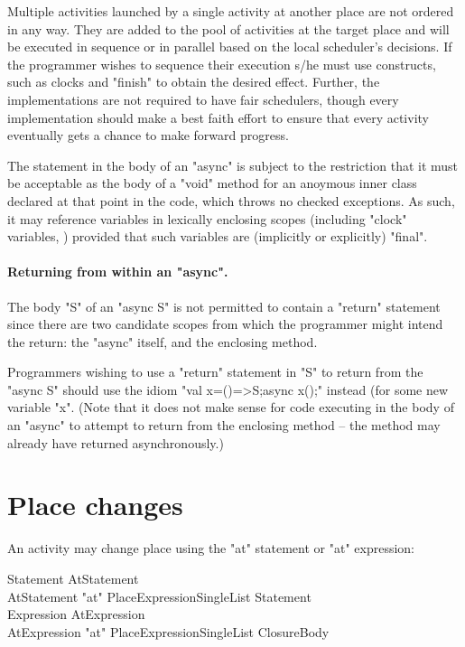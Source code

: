 Multiple activities launched by a single activity at another place are
not ordered in any way. They are added to the pool of activities at
the target place and will be executed in sequence or in parallel based
on the local scheduler's decisions. If the programmer wishes to
sequence their execution s/he must use \Xten{} constructs, such as
clocks and \xcd"finish" to obtain the desired effect.  Further, the
\Xten{} implementations are not required to have fair schedulers,
though every implementation should make a best faith effort to ensure
that every activity eventually gets a chance to make forward progress.

\begin{staticrule*}
The statement in the body of an \xcd"async" is subject to the
restriction that it must be acceptable as the body of a \xcd"void"
method for an anoymous inner class declared at that point in the code,
which throws no checked exceptions. As such, it may reference
variables in lexically enclosing scopes (including \xcd"clock"
variables, ) provided that such variables are
(implicitly or explicitly) \xcd"final".
\end{staticrule*}

\paragraph{Returning from within an \xcd"async".}
The body \xcd"S" of an  \xcd"async S" is not permitted to contain a 
\xcd"return" statement since there are two candidate scopes from which
the programmer might intend the return: the   
\xcd"async" itself, and the enclosing method.

Programmers wishing to use a \xcd"return" statement in \xcd"S" to
return from the \xcd"async S" should use the idiom \xcd"val
x=()=>S;async x();" instead (for some new variable \xcd"x". (Note that
it does not make sense for code executing in the body of an
\xcd"async" to attempt to return from the enclosing method -- the
method may already have returned asynchronously.)


\section{Place changes}\label{AtStatement}

An activity may change place using the \xcd"at" statement or
\xcd"at" expression:

\begin{grammar}
Statement \: AtStatement \\
AtStatement \: \xcd"at" PlaceExpressionSingleList Statement \\
Expression \: AtExpression \\
AtExpression \: \xcd"at" PlaceExpressionSingleList ClosureBody \\
\end{grammar}

